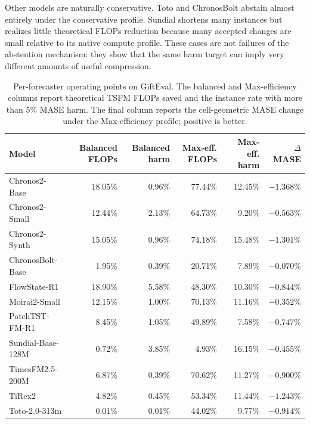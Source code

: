 Other models are naturally conservative.  Toto and ChronosBolt abstain almost
entirely under the conservative profile.  Sundial shortens many instances but
realizes little theoretical FLOPs reduction because many accepted changes are
small relative to its native compute profile.  These cases are not failures of
the abstention mechanism: they show that the same harm target can imply very
different amounts of useful compression.

\begin{table}[t]
    \centering
    \footnotesize
    \renewcommand{\arraystretch}{1.10}
    \caption{Per-forecaster operating points on GiftEval.  The balanced and
    Max-efficiency columns report theoretical TSFM FLOPs saved and the
    instance rate with more than 5\% MASE harm.  The final column reports the
    cell-geometric MASE change under the Max-efficiency profile; positive is
    better.}
    \label{tab:risk-models}
    \begin{tabular*}{\textwidth}{@{\extracolsep{\fill}}lrrrrr@{}}
        \toprule
        Model & Balanced FLOPs & Balanced harm & Max-eff. FLOPs & Max-eff. harm & $\Delta$MASE \\
        \midrule
        Chronos2-Base      & 18.05\% & 0.96\% & 77.44\% & 12.45\% & $-1.368\%$ \\
        Chronos2-Small     & 12.44\% & 2.13\% & 64.73\% &  9.20\% & $-0.563\%$ \\
        Chronos2-Synth     & 15.05\% & 0.96\% & 74.18\% & 15.48\% & $-1.301\%$ \\
        ChronosBolt-Base   &  1.95\% & 0.39\% & 20.71\% &  7.89\% & $-0.070\%$ \\
        FlowState-R1       & 18.90\% & 5.58\% & 48.30\% & 10.30\% & $-0.844\%$ \\
        Moirai2-Small      & 12.15\% & 1.00\% & 70.13\% & 11.16\% & $-0.352\%$ \\
        PatchTST-FM-R1     &  8.45\% & 1.05\% & 49.89\% &  7.58\% & $-0.747\%$ \\
        Sundial-Base-128M  &  0.72\% & 3.85\% &  4.93\% & 16.15\% & $-0.455\%$ \\
        TimesFM2.5-200M    &  6.87\% & 0.39\% & 70.62\% & 11.27\% & $-0.900\%$ \\
        TiRex2             &  4.82\% & 0.45\% & 53.34\% & 11.44\% & $-1.243\%$ \\
        Toto-2.0-313m      &  0.01\% & 0.01\% & 44.02\% &  9.77\% & $-0.914\%$ \\
        \bottomrule
    \end{tabular*}
\end{table}

